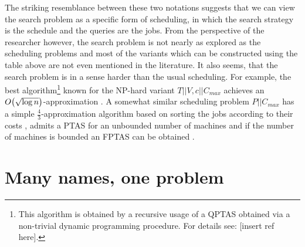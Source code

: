 The striking resemblance between these two notations suggests that we can view the search problem as a specific form of scheduling, in which the search strategy is the schedule and the queries are the jobs. From the perspective of the researcher however, the search problem is not nearly as explored as the scheduling problems and most of the variants which can be constructed using the table above are not even mentioned in the literature. It also seems, that the search problem is in a sense harder than the usual scheduling. For example, the best algorithm\footnote{This algorithm is obtained by a recursive usage of a QPTAS obtained via a non-trivial dynamic programming procedure. For details see: [insert ref here].} known for the NP-hard variant $T||V, c||C_{max}$ achieves an $O\mathopen{}\left( \sqrt{\log n} \right)$-approximation \cite{dereniowski2017ApproxSsForGeneralBSinWTs}. A somewhat similar scheduling problem $P||C_{max}$ has a simple $\frac{4}{3}$-approximation algorithm based on sorting the jobs according to their costs \cite{BoundsonMultiprocessingTimingAnomalies}, admits a PTAS for an unbounded number of machines \cite{Binpackingwithrestrictedpiecesizes} and if the number of machines is bounded an FPTAS can be obtained \cite{AlgorithmsforSchedulingIndependentTasks}.

\section{Many names, one problem}

